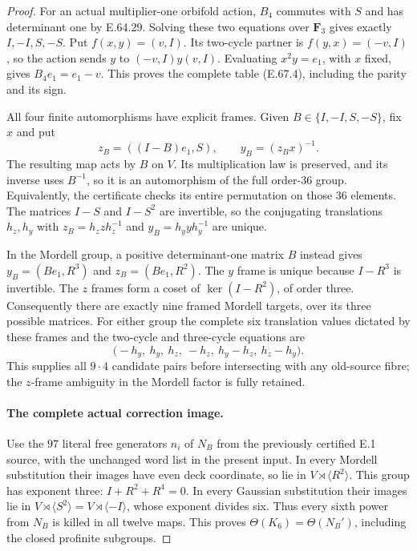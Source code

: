\begin{proof}
For an actual multiplier-one orbifold action, $B_4$ commutes
with $S$ and has determinant one by E.64.29. Solving these
two equations over $\mathbf F_3$ gives exactly
$I,-I,S,-S$. Put $f(x,y)=(v,I)$. Its two-cycle partner
is $f(y,x)=(-v,I)$, so the action sends $y$ to
$(-v,I)y(v,I)$. Evaluating $x^2y=e_1$, with $x$ fixed,
gives $B_4e_1=e_1-v$. This proves the complete table
\textup{(E.67.4)}, including the parity and its sign.

All four finite automorphisms have explicit frames. Given
$B\in\{I,-I,S,-S\}$, fix $x$ and put
\[
        z_B=((I-B)e_1,S),\qquad y_B=(z_Bx)^{-1}.
 \tag{E.67.11}
\]
The resulting map acts by $B$ on $V$. Its multiplication
law is preserved, and its inverse uses $B^{-1}$, so it is
an automorphism of the full order-$36$ group. Equivalently,
the certificate checks its entire permutation on those
$36$ elements. The matrices $I-S$ and $I-S^2$ are
invertible, so the conjugating translations $h_z,h_y$
with $z_B=h_zzh_z^{-1}$ and $y_B=h_yyh_y^{-1}$ are
unique.

In the Mordell group, a positive determinant-one matrix
$B$ instead gives $y_B=(Be_1,R^3)$ and
$z_B=(Be_1,R^2)$. The $y$ frame is unique because
$I-R^3$ is invertible. The $z$ frames form a coset of
$\ker(I-R^2)$, of order three. Consequently there are
exactly nine framed Mordell targets, over its three
possible matrices. For either group the complete six
translation values dictated by these frames and the
two-cycle and three-cycle equations are
\[
 \bigl(-h_y,\ h_y,\ h_z,\ -h_z,\ h_y-h_z,\ h_z-h_y\bigr).
 \tag{E.67.12}
\]
This supplies all $9\cdot4$ candidate pairs before
intersecting with any old-source fibre; the $z$-frame
ambiguity in the Mordell factor is fully retained.

\paragraph{The complete actual correction image.}
Use the $97$ literal free generators $n_i$ of $N_B$ from
the previously certified E.1 source, with the unchanged
word list in the present input. In every Mordell
substitution their images have even deck coordinate,
so lie in $V\rtimes\langle R^2\rangle$. This group
has exponent three: $I+R^2+R^4=0$. In every Gaussian
substitution their images lie in
$V\rtimes\langle S^2\rangle=V\rtimes\langle-I\rangle$,
whose exponent divides six. Thus every sixth power
from $N_B$ is killed in all twelve maps. This proves
$\Theta(K_6)=\Theta(N_B')$, including the closed
profinite subgroups.


\end{proof}
